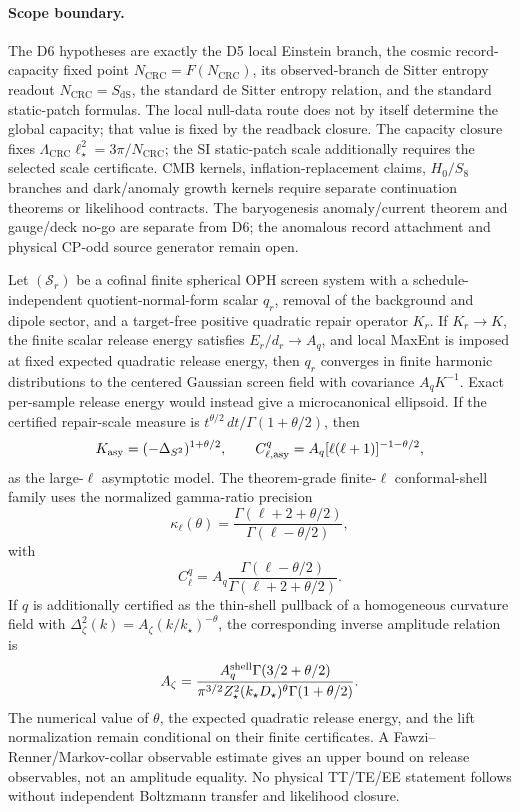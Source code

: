 \paragraph{Scope boundary.}
The D6 hypotheses are exactly the D5 local Einstein branch, the cosmic record-capacity fixed point
\(N_{\mathrm{CRC}}=F(N_{\mathrm{CRC}})\), its observed-branch de Sitter entropy readout
\(N_{\mathrm{CRC}}=S_{\mathrm{dS}}\), the standard de Sitter entropy relation, and the standard
static-patch formulas. The local null-data route does not by itself determine the global capacity;
that value is fixed by the readback closure. The capacity closure fixes
\(\Lambda_{\mathrm{CRC}}\ell_\star^2=3\pi/N_{\mathrm{CRC}}\); the SI static-patch scale
additionally requires the selected scale certificate. CMB kernels, inflation-replacement claims,
\(H_0/S_8\) branches and dark/anomaly growth kernels require separate continuation theorems or
likelihood contracts. The baryogenesis anomaly/current theorem and gauge/deck no-go are separate
from D6; the anomalous record attachment and physical CP-odd source generator remain open.

\begin{theorem}\label{thm:compact-conditional-screen-spectrum}
Let \((\mathcal S_r)\) be a cofinal finite spherical OPH screen system with a
schedule-independent quotient-normal-form scalar \(q_r\), removal of the background and dipole
sector, and a target-free positive quadratic repair operator \(K_r\). If \(K_r\to K\), the finite
scalar release energy satisfies \(E_r/d_r\to A_q\), and local MaxEnt is imposed at fixed expected
quadratic release energy, then \(q_r\) converges in finite harmonic distributions to the centered
Gaussian screen field with covariance \(A_qK^{-1}\). Exact per-sample release energy would instead
give a microcanonical ellipsoid. If the certified repair-scale measure is
\(t^{\theta/2}\,dt/\Gamma(1+\theta/2)\), then
\[
K_{\rm asy}=(-\Delta_{S^2})^{1+\theta/2},
\qquad
C_{\ell,{\rm asy}}^q=A_q[\ell(\ell+1)]^{-1-\theta/2},
\]
as the large-\(\ell\) asymptotic model.  The theorem-grade finite-\(\ell\) conformal-shell family
uses the normalized gamma-ratio precision
\[
\kappa_\ell(\theta)=
\frac{\Gamma(\ell+2+\theta/2)}{\Gamma(\ell-\theta/2)},
\]
with
\[
C_\ell^q=A_q\frac{\Gamma(\ell-\theta/2)}{\Gamma(\ell+2+\theta/2)}.
\]
If \(q\) is additionally certified as the thin-shell pullback of a homogeneous curvature field with
\(\Delta_\zeta^2(k)=A_\zeta(k/k_\star)^{-\theta}\), the corresponding inverse amplitude relation is
\[
A_\zeta=
\frac{A_q^{\rm shell}\Gamma(3/2+\theta/2)}
{\pi^{3/2}Z_\star^2(k_\star D_\star)^\theta\Gamma(1+\theta/2)}.
\]
The numerical value of \(\theta\), the expected quadratic release energy, and the lift normalization remain
conditional on their finite certificates. A Fawzi--Renner/Markov-collar observable estimate gives an
upper bound on release observables, not an amplitude equality. No physical TT/TE/EE statement
follows without independent Boltzmann transfer and likelihood closure.
\end{theorem}

